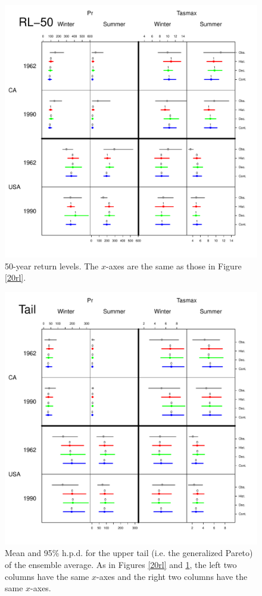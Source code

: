 \documentclass[12pt]{article}
\begin{document}
\begin{figure}
\begin{center}
\includegraphics[scale=0.72]{figs/rl50.pdf}
\end{center}
\caption{50-year return levels. The $x$-axes are the same as those in Figure \ref{20rl}.}
\label{50rl}
\end{figure}

\begin{figure}
\begin{center}
\includegraphics[scale=0.72]{figs/tail.pdf}
\end{center}
\caption{Mean and 95\% h.p.d. for the upper tail (i.e. the generalized Pareto) of the ensemble average. As in Figures \ref{20rl} and \ref{50rl}, the left two columns have the same $x$-axes and the right two columns have the same $x$-axes.}
\label{tail}
\end{figure}
\end{document}
